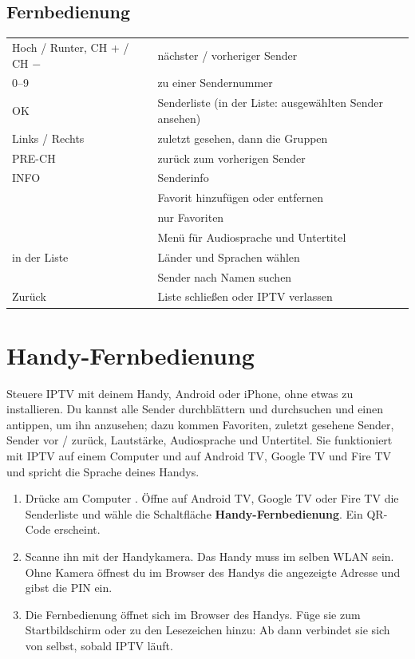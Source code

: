 \subsection{Fernbedienung}
\begin{xltabular}{\linewidth}{@{}KX@{}}
Hoch / Runter, CH + / CH $-$ & nächster / vorheriger Sender \\
0--9 & zu einer Sendernummer \\
OK & Senderliste (in der Liste: ausgewählten Sender ansehen) \\
Links / Rechts & zuletzt gesehen, dann die Gruppen \\
PRE-CH & zurück zum vorherigen Sender \\
INFO & Senderinfo \\
 & Favorit hinzufügen oder entfernen \\
 & nur Favoriten \\
 & Menü für Audiosprache und Untertitel \\
 in der Liste & Länder und Sprachen wählen \\
 & Sender nach Namen suchen \\
Zurück & Liste schließen oder IPTV verlassen \\
\bottomrule
\end{xltabular}


\section{Handy-Fernbedienung}
\label{sec:remote}

Steuere IPTV mit deinem Handy, Android oder iPhone, ohne etwas zu
installieren. Du kannst alle Sender durchblättern und durchsuchen und einen
antippen, um ihn anzusehen; dazu kommen Favoriten, zuletzt gesehene Sender,
Sender vor / zurück, Lautstärke, Audiosprache und Untertitel. Sie
funktioniert mit IPTV auf einem Computer und auf Android TV, Google TV und
Fire TV und spricht die Sprache deines Handys.

\begin{enumerate}
  \item Drücke am Computer . Öffne auf Android TV, Google TV oder
        Fire TV die Senderliste und wähle die Schaltfläche
        \textbf{Handy-Fernbedienung}. Ein QR-Code erscheint.
  \item Scanne ihn mit der Handykamera. Das Handy muss im selben WLAN sein.
        Ohne Kamera öffnest du im Browser des Handys die angezeigte Adresse
        und gibst die PIN ein.
  \item Die Fernbedienung öffnet sich im Browser des Handys. Füge sie zum
        Startbildschirm oder zu den Lesezeichen hinzu: Ab dann verbindet sie
        sich von selbst, sobald IPTV läuft.
\end{enumerate}

